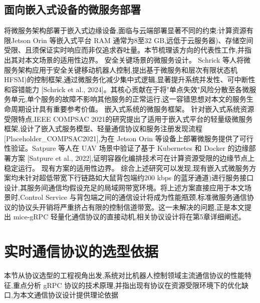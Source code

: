 \subsection{面向嵌入式设备的微服务部署}
将微服务架构部署于嵌入式边缘设备,面临与云端部署显著不同的约束:计算资源有限Jetson Orin 等嵌入式平台 RAM 通常为8至32 GB,远低于云服务器)、存储空间受限、且须保证实时响应而非仅追求吞吐量。本节梳理该方向的代表性工作,并指出其对本文场景的适用性边界。
安全关键场景的微服务设计。 Schrick 等人将微服务架构应用于安全关键移动机器人控制,提出基于微服务和层次有限状态机HFSM)的控制框架,通过微服务化减少集中式逻辑,显著提升系统并发性、可中断性和容错能力 [Schrick et al., 2024]。其核心贡献在于将"单点失效"风险分散至各微服务单元,单个服务的故障不影响其他服务的正常运行,这一容错思想对本文的服务生命周期设计具有重要参考价值。
嵌入式系统的微服务框架。 针对嵌入式系统资源受限特点,IEEE COMPSAC 2021的研究提出了适用于嵌入式平台的轻量级微服务框架,设计了嵌入式服务模型、轻量通信协议和服务注册发现流程 [Placeholder\_COMPSAC2021],为在 Jetson Orin 等设备上部署微服务提供了可行性验证。Satpure 等人在 UAV 场景中验证了基于 Kubernetes 和 Docker 的边缘部署方案 [Satpure et al., 2022],证明容器化编排技术可在计算资源受限的边缘节点上稳定运行。
现有方案的适用性边界。 综合上述研究可以发现,现有嵌入式微服务方案均未针对超低带宽下行链路如大鼠背包端约200 kbps 的蓝牙通道)进行服务接口设计,其服务间通信均假设充足的局域网带宽环境。将上述方案直接应用于本文场景时,Control Service 与背包端之间的通信设计将成为性能瓶颈,标准微服务通信协议的协议头开销将严重挤占有限的控制信道带宽。这一未解决的问题,正是本文提出 mice-gRPC 轻量化通信协议的直接动机,相关协议设计将在第5章详细阐述。

\section{实时通信协议的选型依据}
本节从协议选型的工程视角出发,系统对比机器人控制领域主流通信协议的性能特征,重点分析 gRPC 协议的技术原理,并指出现有协议在资源受限环境下的优化缺口,为本文通信协议设计提供理论依据
